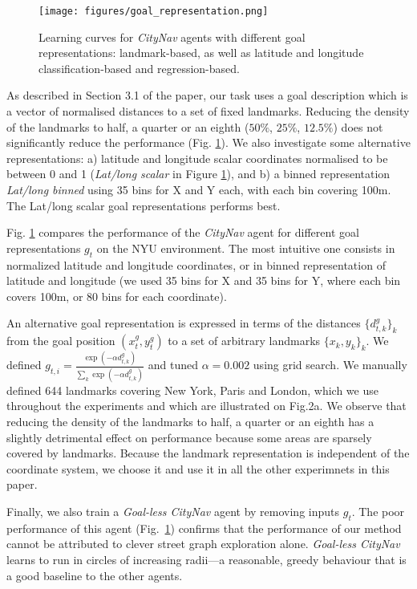 \begin{figure}[!ht]
\begin{center}
\texttt{[image: figures/goal\_representation.png]}
\caption{
Learning curves for \emph{CityNav} agents with different goal representations: landmark-based, as well as latitude and longitude classification-based and regression-based.
}
\label{fig:goal}
\end{center}
\vskip -0.2in
\end{figure}

As described in Section 3.1 of the paper, our task uses a goal description which is a vector of normalised distances to a set of fixed landmarks. Reducing the density of the landmarks to half, a quarter or an eighth ($50\%$, $25\%$, $12.5\%$) does not significantly reduce the performance (Fig. \ref{fig:goal}).
We also investigate some alternative representations: a) latitude and longitude scalar coordinates normalised to be between 0 and 1 (\emph{Lat/long scalar} in Figure \ref{fig:goal}), and b) a binned representation \emph{Lat/long binned} using 35 bins for X and Y each, with each bin covering 100m. The Lat/long scalar goal representations performs best.

Fig. \ref{fig:goal} compares the performance of the \emph{CityNav} agent for different goal representations $g_t$ on the NYU environment. The most intuitive one consists in normalized latitude and longitude coordinates, or in binned representation of latitude and longitude (we used 35 bins for X and 35 bins for Y, where each bin covers 100m, or 80 bins for each coordinate).

An alternative goal representation is expressed in terms of the distances $\{d^g_{t,k}\}_k$ from the goal position $(x^g_t, y^g_t)$ to a set of arbitrary landmarks $\{x_k, y_k\}_k$. We defined $g_{t,i} = \frac{\exp(-\alpha d^g_{t,k})}{\sum_k \exp(-\alpha d^g_{t,k})}$ and tuned $\alpha=0.002$ using grid search. We manually defined 644 landmarks covering New York, Paris and London, which we use throughout the experiments and which are illustrated on Fig.2a. We observe that reducing the density of the landmarks to half, a quarter or an eighth has a slightly detrimental effect on performance because some areas are sparsely covered by landmarks. Because the landmark representation is independent of the coordinate system, we choose it and use it in all the other experimnets in this paper.

Finally, we also train a  \emph{Goal-less CityNav} agent by removing inputs $g_t$. The poor performance of this agent (Fig.~\ref{fig:goal}) confirms that the performance of our method cannot be attributed to clever street graph exploration alone. \emph{Goal-less CityNav} learns to run in circles of increasing radii---a reasonable, greedy behaviour that is a good baseline to the other agents.

